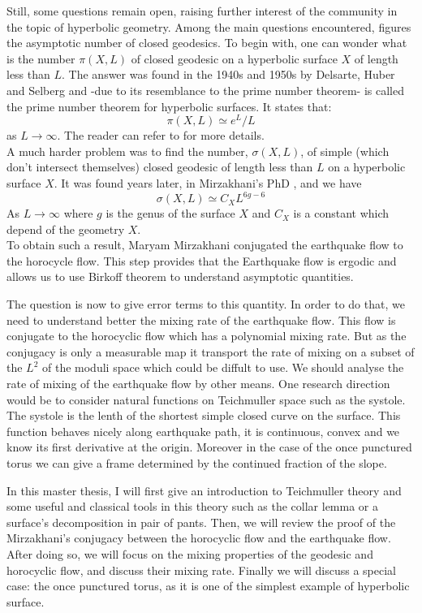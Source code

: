 \vspace{10 px}

Still, some questions remain open, raising further interest of the community in the topic of hyperbolic geometry.
Among the main questions encountered, figures the asymptotic number of closed geodesics. To begin with, one can wonder what is the number $\pi(X,L)$ of closed geodesic on a hyperbolic surface $X$ of length less than $L$. The answer was found in the 1940s and 1950s by Delsarte, Huber and Selberg and -due to its resemblance to the prime number theorem- is called the prime number theorem for hyperbolic surfaces. It states that:\[
\pi(X,L) \simeq e^{L} / L
\]
as $L \to \infty$. The reader can refer to \cite{buser2010geometry} for more details.\\

A much harder problem was to find the number, $\sigma(X,L)$, of simple (which don't intersect themselves) closed geodesic of length less than $L$ on a hyperbolic surface $X$. It was found years later, in Mirzakhani's PhD \cite{mirzakhani2004simple}, and we have \[
\sigma(X,L) \simeq C_{X}L^{6g-6}
\]
As $L \to \infty$ where $g$ is the genus of the surface $X$ and $C_{X}$ is a constant which depend of the geometry $X$.\\
To obtain such a result, Maryam Mirzakhani conjugated the earthquake flow to the horocycle flow. This step provides that the Earthquake flow is ergodic and allows us to use Birkoff theorem to understand asymptotic quantities.

\vspace{10 px}

The question is now to give error terms to this quantity. In order to do that, we need to understand better the mixing rate of the earthquake flow. This flow is conjugate to the horocyclic flow which has a polynomial mixing rate. But as the conjugacy is only a measurable map it transport the rate of mixing on a subset of the $L^2$ of the moduli space which could be diffult to use. We should analyse the rate of mixing of the earthquake flow by other means. One research direction would be to consider natural functions on Teichmuller space such as the systole. The systole is the lenth of the shortest simple closed curve on the surface. This function behaves nicely along earthquake path, it is continuous, convex and we know its first derivative at the origin. Moreover in the case of the once punctured torus we can give a frame determined by the continued fraction of the slope.

\vspace{10 px}

In this master thesis, I will first give an introduction to Teichmuller theory and some useful and classical tools in this theory such as the collar lemma or a surface's decomposition in pair of pants. Then, we will review the proof of the Mirzakhani's conjugacy between the horocyclic flow and the earthquake flow. After doing so, we will focus on the mixing properties of the geodesic and horocyclic flow, and discuss their mixing rate. Finally we will discuss a special case: the once punctured torus, as it is one of the simplest example of hyperbolic surface.
